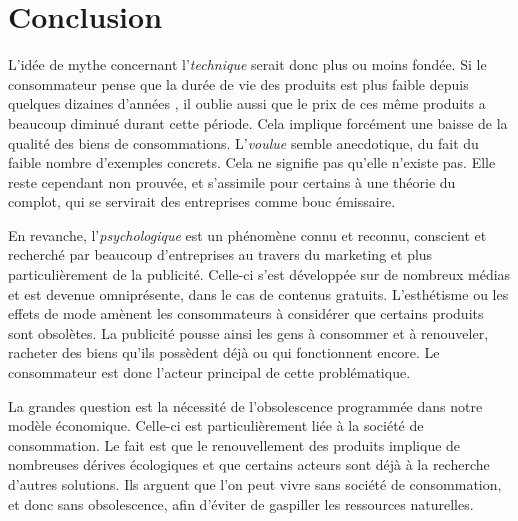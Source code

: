 \chapter*{Conclusion}

%
%
%
%
%

L'idée de mythe concernant l'\op \textit{technique} serait donc plus ou moins fondée. Si le consommateur pense que la durée de vie des produits est plus faible depuis quelques dizaines d'années , il oublie aussi que le prix de ces même produits a beaucoup diminué durant cette période. Cela implique forcément une baisse de la qualité des biens de consommations. L'\op \textit{voulue} semble anecdotique, du fait du faible nombre d'exemples concrets. Cela ne signifie pas qu'elle n'existe pas. Elle reste cependant non prouvée, et s'assimile pour certains à une théorie du complot, qui se servirait des entreprises comme bouc émissaire. 

\bigbreak
En revanche, l'\op \textit{psychologique} est un phénomène connu et reconnu, conscient et recherché par beaucoup d'entreprises au travers du marketing et plus particulièrement de la publicité. Celle-ci s'est développée sur de nombreux médias et est devenue omniprésente, dans le cas de contenus gratuits. L'esthétisme ou les effets de mode amènent les consommateurs à considérer que certains produits sont obsolètes. La publicité pousse ainsi les gens à consommer et à renouveler, racheter des biens qu'ils possèdent déjà ou qui fonctionnent encore. Le consommateur est donc l’acteur principal de cette problématique.

\bigbreak
La grandes question est la nécessité de l'obsolescence programmée dans notre modèle économique. Celle-ci est particulièrement liée à la société de consommation. Le fait est que le renouvellement des produits implique de nombreuses dérives écologiques et que certains acteurs sont déjà à la recherche d'autres solutions. Ils arguent que l'on peut vivre sans société de consommation, et donc sans obsolescence, afin d'éviter de gaspiller les ressources naturelles.